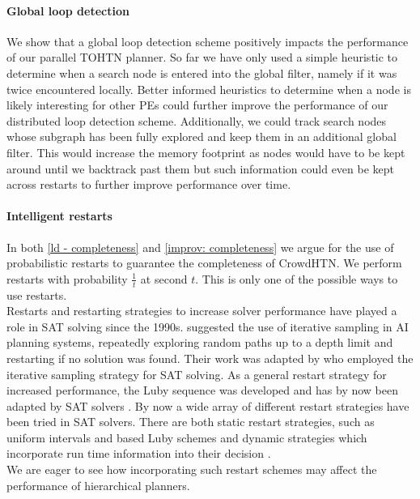 \paragraph{Global loop detection}
We show that a global loop detection scheme positively impacts the performance of our parallel TOHTN planner. So far we have only used a simple heuristic to determine when a search node is entered into the global filter, namely if it was twice encountered locally.
Better informed heuristics to determine when a node is likely interesting for other PEs could further improve the performance of our distributed loop detection scheme. Additionally, we could track search nodes whose subgraph has been fully explored and keep them in an additional global filter. This would increase the memory footprint as nodes would have to be kept around until we backtrack past them but such information could even be kept across restarts to further improve performance over time.

\paragraph{Intelligent restarts}
In both \ref{ld - completeness} and \ref{improv: completeness} we argue for the use of probabilistic restarts to guarantee the completeness of CrowdHTN. We perform restarts with probability $\frac{1}{t}$ at second $t$. This is only one of the possible ways to use restarts. \\
Restarts and restarting strategies to increase solver performance have played a role in SAT solving since the 1990s.
\cite{langley1992systematic} suggested the use of iterative sampling in AI planning systems, repeatedly exploring random paths up to a depth limit and restarting if no solution was found. 
Their work was adapted by \cite{crawford1994experimental} who employed the iterative sampling strategy for SAT solving. As a general restart strategy for increased performance, the Luby sequence was developed \cite{luby1993optimal} and has by now been adapted by SAT solvers \cite{huang2007effect}. By now a wide array of different restart strategies have been tried in SAT solvers. There are both static restart strategies, such as uniform intervals and based Luby schemes and dynamic strategies which incorporate run time information into their decision \cite{biere2015evaluating}. \\
We are eager to see how incorporating such restart schemes may affect the performance of hierarchical planners.

